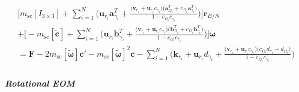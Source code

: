 \begin{gather}
\begin{split}
\Bigg[ m_{\text{sc}}[I_{3\times3}]+ \sum\limits_{i=1}^{N}\Bigg(\bm{u}_{r_i}\bm{a}_{\gamma_i}^T + \frac{\big(\bm{v}_{r_i} + \bm{u}_{r_i}c_{\gamma_i}\big)\big(\bm{a}_{\Omega_i}^T + c_{\Omega_i}\bm{a}_{\gamma_i}^T\big)}{1 - c_{\Omega_i}c_{\gamma_i}}\Bigg) \Bigg] \ddot{\bm r}_{B/N}
\\+ \Bigg[- m_{\text{sc}}[\tilde{\bm{c}}] +  \sum\limits_{i=1}^{N}\Bigg(\bm{u}_{r_i}\bm{b}_{\gamma_i}^T + \frac{\big(\bm{v}_{r_i} + \bm{u}_{r_i}c_{\gamma_i}\big)\big(\bm{b}_{\Omega_i}^T + c_{\Omega_i}\bm{b}_{\gamma_i}^T\big)}{1 - c_{\Omega_i}c_{\gamma_i}}\Bigg)\Bigg] \dot{\bm{\omega}}
\\= \bm{F} - 2m_{\text{sc}}[\tilde{\bm{\omega}}]\bm{c}' - m_{\text{sc}}[\tilde{\bm{\omega}}]^2\bm{c} -  \sum\limits_{i=1}^{N}\Bigg(\bm{k}_{r_i}+\bm{u}_{r_i}d_{\gamma_i} + \frac{\big(\bm{v}_{r_i} + \bm{u}_{r_i}c_{\gamma_i}\big)\big(c_{\Omega_i}d_{\gamma_i} + d_{\Omega_i}\big)}{1 - c_{\Omega_i}c_{\gamma_i}}\Bigg)
\end{split}
\end{gather}

\subparagraph{Rotational EOM}

